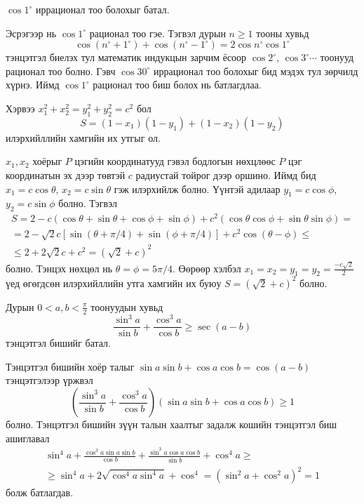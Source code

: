 \documentclass[10pt,a4paper,oneside]{book}
\begin{document}
\Problem
$\cos 1^\circ$ иррационал тоо болохыг батал.

\TheSolution
Эсрэгээр нь $\cos 1^\circ$ рационал тоо гэе. Тэгвэл дурын $n \geq 1$  тооны хувьд
\begin{equation*}
\cos (n^\circ + 1^\circ) + \cos (n^\circ - 1^\circ) = 2\cos n^\circ \cos 1^\circ
\end{equation*}
тэнцэтгэл биелэх тул математик индукцын зарчим ёсоор $\cos 2^\circ$, $\cos 3^\circ \cdots$  тоонууд рационал тоо болно. Гэвч $\cos 30^\circ$ иррационал тоо болохыг бид мэдэх тул зөрчилд хүрнэ. Иймд $\cos 1^\circ$ рационал тоо биш болох нь батлагдлаа.

 Хэрвээ $x_1^2 + x_2^2 = y_1^2 + y_2^2 = c^2$ бол
\begin{equation*}
S = (1-x_1)(1-y_1) + (1-x_2)(1-y_2)
\end{equation*}
илэрхийллийн хамгийн их утгыг ол.

\TheSolution
$x_1, x_2$ хоёрыг $P$ цэгийн координатууд гэвэл бодлогын нөхцлөөс $P$ цэг координатын эх дээр төвтэй $c$ радиустай тойрог дээр оршино. Иймд бид $x_1 = c\cos \theta$, $x_2 = c\sin \theta$ гэж илэрхийлж болно. Үүнтэй адилаар $y_1 = c\cos \phi$, $y_2 = c\sin \phi$ болно. Тэгвэл
\begin{align*}
S = 2-c(\cos \theta + \sin \theta + \cos \phi + \sin \phi) + c^2 (\cos \theta\cos \phi + \sin \theta \sin \phi) = \\
 = 2 - \sqrt{2}c\left[\sin(\theta + \pi/4) + \sin(\phi + \pi/4)\right] + c^2 \cos(\theta - \phi) \leq \\
 \leq 2 + 2\sqrt{2}c + c^2 = (\sqrt{2} + c)^2
\end{align*}
болно. Тэнцэх нөхцөл нь $\theta = \phi = 5\pi/4$. Өөрөөр хэлбэл $x_1 = x_2 = y_1 = y_2 = \frac{-c\sqrt{2}}{2}$ үед өгөгдсөн илэрхийллийн утга хамгийн их буюу $S = (\sqrt{2}+ c)^2$ болно.

\Problem
Дурын $0<a, b < \frac{\pi}{2}$ тоонуудын хувьд
\begin{equation*}
\frac{\sin^3 a}{\sin b} + \frac{\cos^3 a}{\cos b} \geq \sec(a-b)
\end{equation*}
тэнцэтгэл бишийг батал.

\TheSolution
Тэнцэтгэл бишийн хоёр талыг $\sin a\sin b + \cos a\cos b = \cos(a-b)$ тэнцэтгэлээр үржвэл
\begin{equation*}
\left(\frac{\sin^3 a}{\sin b} + \frac{\cos^3 a}{\cos b}\right)\left(\sin a \sin b + \cos a \cos b\right) \geq 1
\end{equation*}
болно. Тэнцэтгэл бишийн зүүн талын хаалтыг задалж кошийн тэнцэтгэл биш ашиглавал
\begin{align*}
\sin^4 a + \frac{\cos^3 a \sin a \sin b}{\cos b} + \frac{\sin^3 a\cos a \cos b}{\sin b} + \cos^4 a \geq \\
\geq \sin^4 a + 2\sqrt{\cos^4 a\sin^4 a} + \cos^4 = (\sin^2 a + \cos^2 a)^2 = 1
\end{align*}
болж батлагдав.
\end{document}
